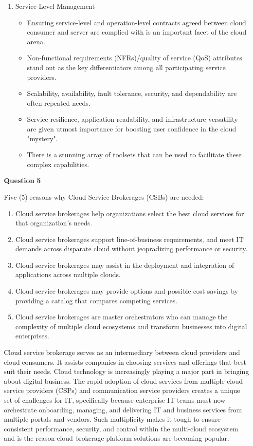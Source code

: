 \documentclass[a4paper, 12pt]{article}
\begin{document}
\begin{enumerate}
\item
Service-Level Management
\begin{itemize}
\item
Ensuring service-level and operation-level contracts agreed between cloud consumer and server are complied with is an important facet of the cloud arena. 
\item
Non-functional requirements (NFRs)/quality of service (QoS) attributes stand out as the key differentiators among all participating service providers.
\item
Scalability, availability, fault tolerance, security, and dependability are often repeated needs.
\item
Service resilience, application readability, and infrastructure versatility are given utmost importance for boosting user confidence in the cloud "mystery".
\item
There is a stunning array of toolsets that can be used to facilitate these complex capabilities. 
\end{itemize}
\end{enumerate}


\newpage
\begin{center}
	\textbf{Question 5}
\end{center}

Five (5) reasons why Cloud Service Brokerages (CSBs) are needed:
\begin{enumerate}
\item
Cloud service brokerages help organizations select the best cloud services for that organization's needs.
\item
Cloud service brokerages support line-of-business requirements, and meet IT demands across disparate cloud without jeopradizing performance or security.
\item
Cloud service brokerages may assist in the deployment and integration of applications across multiple clouds.
\item
Cloud service brokerages may provide options and possible cost savings by providing a catalog that compares competing services.
\item
Cloud service brokerages are master orchestrators who can manage the complexity of multiple cloud ecosystems and transform businesses into digital enterprises.
\end{enumerate}

Cloud service brokerage serves as an intermediary between cloud providers and cloud consumers. It assists companies in choosing services and offerings that best suit their needs. Cloud technology is increasingly playing a major part in bringing about digital business.
The rapid adoption of cloud services from multiple cloud service providers (CSPs) and communication service providers creates a unique set of challenges for IT, specifically because enterprise IT teams must now orchestrate onboarding, managing, and delivering IT and business services from multiple portals and vendors. Such multiplicity makes it tough to ensure consistent performance, security, and control within the multi-cloud ecosystem and is the reason cloud brokerage platform solutions are becoming popular.
\end{document}
